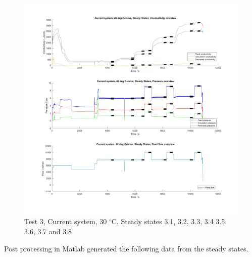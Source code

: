 \begin{figure}[H]
    \centering
    \includegraphics[width=1.1\textwidth]{overview40}
    \caption{Test 3, Current system, 30 $^{\circ}$C. Steady states 3.1, 3.2, 3.3, 3.4 3.5, 3.6, 3.7 and 3.8}
    \label{fig:overw40}
\end{figure}

\newpage

Post processing in Matlab generated the following data from the steady states.

